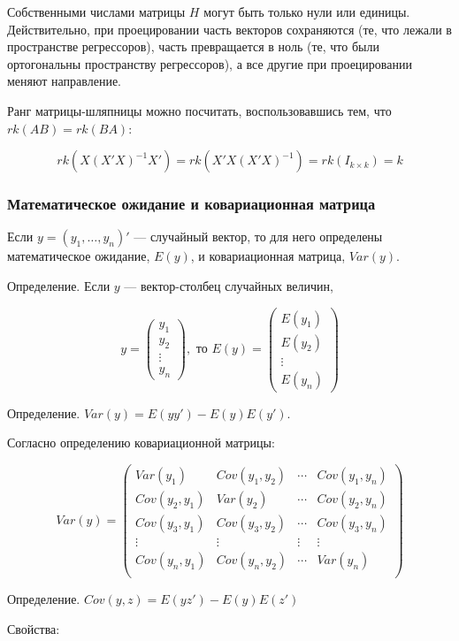 \documentclass[]{article}
\begin{document}
Собственными числами матрицы $H$ могут быть только нули или единицы.
Действительно, при проецировании часть векторов сохраняются (те, что
лежали в пространстве регрессоров), часть превращается в ноль (те, что
были ортогональны пространству регрессоров), а все другие при
проецировании меняют направление.

Ранг матрицы-шляпницы можно посчитать, воспользовавшись тем, что
$rk (AB)=rk (BA)$:

\[
rk(X(X'X)^{-1}X')=rk(X'X(X'X)^{-1})=rk(I_{k\times k})=k
\]

\subsubsection{Математическое ожидание и ковариационная
матрица}\label{----}

Если $y=(y_1, \ldots, y_n)'$ --- случайный вектор, то для него
определены математическое ожидание, $E(y)$, и ковариационная матрица,
$Var(y)$.

Определение. Если $y$ --- вектор-столбец случайных величин,

\[
y=
\begin{pmatrix}
y_1 \\
y_2 \\
\vdots \\
y_n
\end{pmatrix}
,
\text{ то }
E(y)=
\begin{pmatrix}
E(y_1) \\
E(y_2) \\
\vdots \\
E(y_n)
\end{pmatrix}
\]

Определение. $Var(y)=E(yy')-E(y)E(y')$.

Согласно определению ковариационной матрицы:

\[
Var(y) = \begin{pmatrix}
Var(y_1) & Cov(y_1,y_2) & \cdots & Cov(y_1,y_n) \\
Cov(y_2,y_1) & Var(y_2) & \cdots & Cov(y_2,y_n) \\
Cov(y_3,y_1) & Cov(y_3,y_2) & \cdots & Cov(y_3,y_n) \\
\vdots & \vdots & \vdots & \vdots \\
Cov(y_n,y_1) & Cov(y_n,y_2) & \cdots & Var(y_n) \\
\end{pmatrix}
\]

Определение. $Cov(y,z)=E(yz')-E(y)E(z')$

Свойства:
\end{document}
